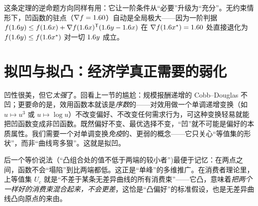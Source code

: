 这条定理的逆命题方向同样有用：它让一阶条件从``必要''升级为``充分''。无约束情形下，凹函数的驻点（$\nabla f=1.6 0$）自动是全局极大——因为一阶判据 $f(1.6 y)\le f(1.6 x)+\nabla f(1.6 x)^{\mathsf{T}}(1.6 y-1.6 x)$ 在 $\nabla f(1.6 x^*)=1.6 0$ 处直接退化为 $f(1.6 y)\le f(1.6 x^*)$ 对一切 $1.6 y$ 成立。


\section{拟凹与拟凸：经济学真正需要的弱化}
\label{sec:convex-5}

凹性很美，但它\emph{太强}了。回看上一节的尴尬：规模报酬递增的 Cobb--Douglas 不凹；更要命的是，效用函数本就该是\emph{序数}的——对效用做一个单调递增变换（如 $u\mapsto u^3$ 或 $u\mapsto\log u$）不改变偏好、不改变任何需求行为，可这种变换轻易就能把凹函数变成非凹函数。既然偏好不变、最优选择不变，``凹''就不可能是偏好的本质属性。我们需要一个对单调变换\emph{免疫}的、更弱的概念——它只关心``等值集的形状''，而非``曲线弯多狠''。这就是拟凹。


后一个等价说法（``凸组合处的值不低于两端的较小者'')最便于记忆：在两点之间，函数不会``塌陷''到比两端都低。这正是``单峰''的多维推广。在消费者理论里，上等值集 $U_c$ 就是``不差于某条无差异曲线的所有消费束''——它凸，意味着\emph{把两个一样好的消费束混合起来，不会更差}，这恰是``凸偏好''的标准假设，也是无差异曲线凸向原点的来由。

